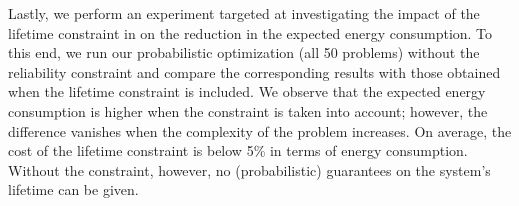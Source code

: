 Lastly, we perform an experiment targeted at investigating the impact of the
lifetime constraint in  on the reduction in
the expected energy consumption. To this end, we run our probabilistic
optimization (all 50 problems) without the reliability constraint and compare
the corresponding results with those obtained when the lifetime constraint is
included. We observe that the expected energy consumption is higher when the
constraint is taken into account; however, the difference vanishes when the
complexity of the problem increases. On average, the cost of the lifetime
constraint is below 5\% in terms of energy consumption. Without the constraint,
however, no (probabilistic) guarantees on the system's lifetime can be given.
